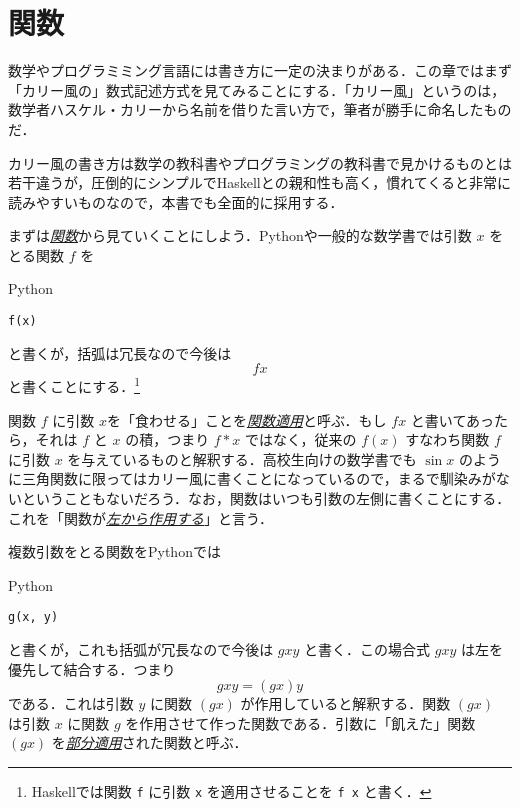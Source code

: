 \documentclass[a4paper,draft]{jsbook}
\newcommand{\programminglanguage}[1]{\textsf{#1}}
\newcommand{\haskell}{\programminglanguage{Haskell}}
\newcommand{\python}{\programminglanguage{Python}}
\newcommand{\keyword}[1]{{\underline{\emph{#1}}}}
\newcommand{\code}[1]{\texttt{#1}}
\newenvironment{pythoncode}{\begin{itembox}[r]{\python}}{\end{itembox}}
\begin{document}
\section{関数}

数学やプログラミミング言語には書き方に一定の決まりがある．この章ではまず「カリー風の」数式記述方式を見てみることにする．「カリー風」というのは，数学者ハスケル・カリーから名前を借りた言い方で，筆者が勝手に命名したものだ．

カリー風の書き方は数学の教科書やプログラミングの教科書で見かけるものとは若干違うが，圧倒的にシンプルで\haskell との親和性も高く，慣れてくると非常に読みやすいものなので，本書でも全面的に採用する．

まずは\keyword{関数}から見ていくことにしよう．\python や一般的な数学書では引数 $x$ をとる関数 $f$ を
\begin{pythoncode}
\begin{verbatim}
f(x)
\end{verbatim}
\end{pythoncode}
と書くが，括弧は冗長なので今後は
\begin{equation}
fx
\end{equation}
と書くことにする．\footnote{\haskell では関数 \code{f} に引数 \code{x} を適用させることを  \code{f x} と書く．}


関数 $f$ に引数 $x$を「食わせる」ことを\keyword{関数適用}と呼ぶ．もし $fx$ と書いてあったら，それは $f$ と $x$ の積，つまり $f*x$ ではなく，従来の $f(x)$ すなわち関数 $f$ に引数 $x$ を与えているものと解釈する．高校生向けの数学書でも $\sin x$ のように三角関数に限ってはカリー風に書くことになっているので，まるで馴染みがないということもないだろう．なお，関数はいつも引数の左側に書くことにする．これを「関数が\keyword{左から作用する}」と言う．

複数引数をとる関数を\python では
\begin{pythoncode}
\begin{verbatim}
g(x, y)
\end{verbatim}
\end{pythoncode}
と書くが，これも括弧が冗長なので今後は $gxy$ と書く．この場合式 $gxy$ は左を優先して結合する．つまり
\begin{equation}
gxy=(gx)y
\end{equation}
である．これは引数 $y$ に関数 $(gx)$ が作用していると解釈する．関数 $(gx)$ は引数 $x$ に関数 $g$ を作用させて作った関数である．引数に「飢えた」関数 $(gx)$ を\keyword{部分適用}された関数と呼ぶ．
\end{document}
